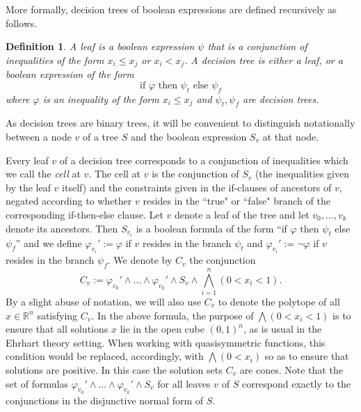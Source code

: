 \documentclass[12pt,reqno]{amsart}
\newtheorem{definition}{Definition}
\numberwithin{definition}{section}
\theoremstyle{definition}
\newcommand{\RR}{\mathbb{R}}
\begin{document}
More formally, decision trees of boolean expressions are defined recursively as follows.

\begin{definition} A \emph{leaf} is a boolean expression $\psi$ that is a conjunction of inequalities of the form $x_i \leq x_j$ or $x_i < x_j$. A \emph{decision tree} is either a leaf, or a boolean expression of the form
\[
  \text{if $\varphi$ then $\psi_t$ else $\psi_f$}
\]
where $\varphi$ is an inequality of the form $x_i \leq x_j$ and $\psi_t,\psi_f$ are decision trees.
\end{definition}

As decision trees are binary trees, it will be convenient to distinguish notationally between a node $v$ of a tree $S$ and the boolean expression $S_v$ at that node.

Every leaf $v$ of a decision tree corresponds to a conjunction of inequalities which we call the \emph{cell} at $v$. The cell at $v$ is the conjunction of $S_v$ (the inequalities given by the leaf $v$ itself) and the constraints given in the if-clauses of ancestors of $v$, negated according to whether $v$ resides in the ``true" or ``false" branch of the corresponding if-then-else clause. Let $v$ denote a leaf of the tree and let $v_0,\ldots,v_k$ denote its ancestors. Then $S_{v_i}$ is a boolean formula of the form ``if $\varphi$ then $\psi_t$ else $\psi_f$'' and we define $\varphi_{v_i}' := \varphi$ if $v$ resides in the branch $\psi_t$ and $\varphi_{v_i}' := \neg\varphi$ if $v$ resides in the branch $\psi_f$. We denote by $C_v$ the conjunction
\[
 C_v := \varphi_{v_0}'\wedge\ldots\wedge\varphi_{v_k}'\wedge S_v\wedge \bigwedge_{i=1}^n (0 < x_i < 1).
\]
By a slight abuse of notation, we will also use $C_v$ to denote the polytope of all $x\in \RR^n$ satisfying $C_v$. In the above formula, the purpose of $\bigwedge (0 < x_i <1)$ is to ensure that all solutions $x$ lie in the open cube $(0,1)^n$, as is usual in the Ehrhart theory setting. When working with quasisymmetric functions, this condition would be replaced, accordingly, with $\bigwedge (0 < x_i)$ so as to ensure that solutions are positive. In this case the solution sets $C_v$ are cones. Note that the set of formulas $\varphi_{v_0}'\wedge\ldots\wedge\varphi_{v_k}'\wedge S_v$ for all leaves $v$ of $S$ correspond exactly to the conjunctions in the disjunctive normal form of $S$.
\end{document}

